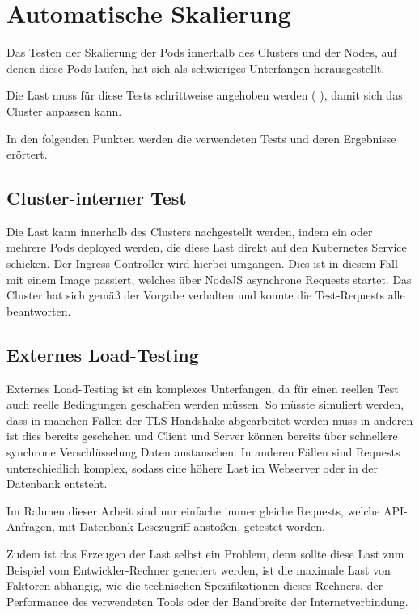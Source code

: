 \section{Automatische Skalierung}

Das Testen der Skalierung der Pods innerhalb des Clusters und der Nodes,
auf denen diese Pods laufen, hat sich als schwieriges Unterfangen herausgestellt.

Die Last muss für diese Tests schrittweise angehoben werden
( \cite{cloudtest}),
damit sich das Cluster anpassen kann.

In den folgenden Punkten werden die verwendeten Tests und deren Ergebnisse
erörtert.

\subsection{Cluster-interner Test}

Die Last kann innerhalb des Clusters nachgestellt werden, indem ein oder mehrere
Pods deployed werden, die diese Last direkt auf den Kubernetes Service schicken.
Der Ingress-Controller wird hierbei umgangen.
Dies ist in diesem Fall mit einem Image passiert, welches über NodeJS
asynchrone Requests startet. Das Cluster hat sich gemäß der Vorgabe verhalten
und konnte die Test-Requests alle beantworten.

\subsection{Externes Load-Testing}

Externes Load-Testing ist ein komplexes Unterfangen, da für einen
reellen Test auch reelle Bedingungen geschaffen werden müssen.
So müsste simuliert werden, dass in manchen Fällen der TLS-Handshake
abgearbeitet werden muss in anderen ist dies bereits geschehen und
Client und
Server können bereits über schnellere synchrone
Verschlüsselung Daten austauschen.
In anderen Fällen sind Requests unterschiedlich
komplex, sodass
eine höhere Last im Webserver oder in der Datenbank entsteht.

Im Rahmen dieser Arbeit sind nur einfache immer gleiche Requests, welche
API-Anfragen, mit Datenbank-Lesezugriff anstoßen, getestet worden.

Zudem ist das Erzeugen der Last selbst ein Problem, denn sollte diese Last
zum Beispiel vom Entwickler-Rechner generiert werden, ist die maximale Last
von Faktoren abhängig, wie die technischen Spezifikationen
dieses Rechners, der Performance des verwendeten Tools oder
der Bandbreite der Internetverbindung.

